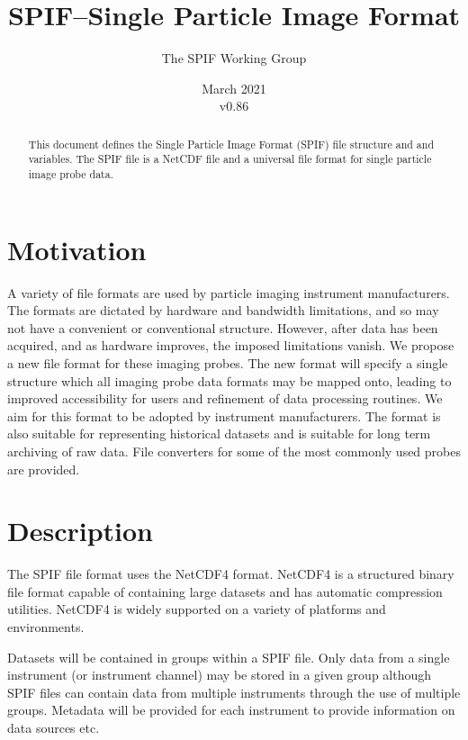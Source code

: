 \documentclass[12pt,a4paper]{article}
\begin{document}
\title{SPIF--Single Particle Image Format}
\author{The SPIF Working Group}
\date{March 2021\\v0.86}

\maketitle
\begin{abstract}
This document defines the Single Particle Image Format (SPIF) file structure and and variables. The SPIF file is a NetCDF file and a universal file format for single particle image probe data.
\end{abstract}
\tableofcontents


\section{Motivation}
A variety of file formats are used by particle imaging instrument manufacturers. The formats are dictated by hardware and bandwidth limitations, and so may not have a convenient or conventional structure. However, after data has been acquired, and as hardware improves, the imposed limitations vanish. We propose a new file format for these imaging probes. The new format will specify a single structure which all imaging probe data formats may be mapped onto, leading to improved accessibility for users and refinement of data processing routines. We aim for this format to be adopted by instrument manufacturers. The format is also suitable for representing historical datasets and is suitable for long term archiving of raw data. File converters for some of the most commonly used probes are provided.


\section{Description}
The SPIF file format uses the NetCDF4 format. NetCDF4 is a structured binary file format capable of containing large datasets and has automatic compression utilities. NetCDF4 is widely supported on a variety of platforms and environments.
\par
Datasets will be contained in groups within a SPIF file. Only data from a single instrument (or instrument channel) may be stored in a given group although SPIF files can contain data from multiple instruments through the use of multiple groups.
Metadata will be provided for each instrument to provide information on data sources etc.
\end{document}
